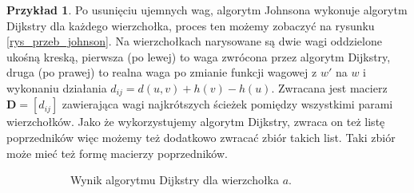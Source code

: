 \documentclass[12pt,a4paper]{book}
\theoremstyle{definition}
\newtheorem{ex}{Przykład}
\numberwithin{equation}{chapter}
\begin{document}
\begin{ex}
Po usunięciu ujemnych wag, algorytm Johnsona wykonuje algorytm Dijkstry dla każdego wierzchołka, proces ten możemy zobaczyć na rysunku \ref{rys_przeb_johnson}. Na wierzchołkach narysowane są dwie wagi oddzielone ukośną kreską, pierwsza (po lewej) to waga zwrócona przez algorytm Dijkstry, druga (po prawej) to realna waga po zmianie funkcji wagowej z $w'$ na $w$ i wykonaniu działania $d_{i j} = d(u, v) + h(v) - h(u)$. Zwracana jest macierz $\mathbf{D} = [d_{i j}]$ zawierająca wagi najkrótszych ścieżek pomiędzy wszystkimi parami wierzchołków. Jako że wykorzystujemy algorytm Dijkstry, zwraca on też listę poprzedników więc możemy też dodatkowo zwracać zbiór takich list. Taki zbiór może mieć też formę macierzy poprzedników.  
\begin{figure}[H]
\centering
\begin{subfigure}[b]{0.45\textwidth}
	\centering
	\caption{Wynik algorytmu Dijkstry dla wierzchołka $a$.}
	\label{rys_johnson_a}
\end{subfigure}
~
\begin{subfigure}[b]{0.45\textwidth}
	\centering
\end{subfigure}
\end{figure}
\end{ex}
\end{document}

